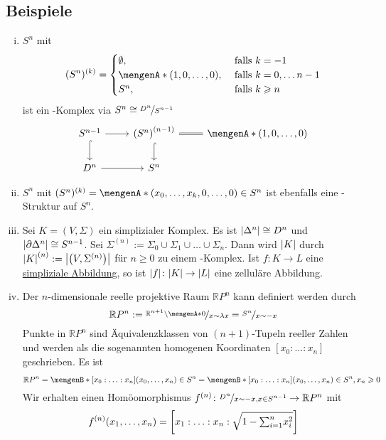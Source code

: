 \subsection[Beispiele für \CW-Komplexe]{Beispiele} %
\label{sub:115}
\begin{enumerate}[(i)]
	\item $S^n$ mit 
	\[
		(S^n)^{(k)} = \begin{cases}
			\emptyset, &\text{ falls }k=-1\\
			\set{(1,0,\ldots ,0)}, &\text{ falls } k=0, \ldots n-1 \\
			S^n , &\text{ falls } k \ge n 
		\end{cases}
	\]
	ist ein \CW-Komplex via $S^n \cong \nicefrac{D^n}{S^{n-1}}$
	\[
		\begin{tikzcd}
			S^{n-1} \rar \dar[hook] & \enbrace*{S^n}^{(n-1)} \rar[equal] \dar[hook] & \set{(1,0,\ldots ,0)}   \\
			D^n \rar & S^n  
		\end{tikzcd}
	\]
	\item $S^n$ mit $(S^n)^{(k)} = \set{(x_0, \ldots ,x_k,0, \ldots ,0) \in S^n} $ ist ebenfalls eine \CW-Struktur auf $S^n$.
	\item Sei $K=(V,\Sigma)$ ein simplizialer Komplex. Es ist $\abs*{\Delta^n} \cong D^n$ und $\abs*{\partial \Delta^n} \cong S^{n-1}$. Sei 
	$\Sigma^{(n)} := \Sigma_0 \cup \Sigma_1 \cup \ldots \cup \Sigma_n$. Dann wird $\abs*{K}$ durch $\abs*{K}^{(n)} := \abs*{\enbrace*{V,\Sigma^{(n)}}}$ für $n \ge 0$ zu 
	einem \CW-Komplex. Ist $f \colon K \to L$ eine \hyperref[sub:25]{simpliziale Abbildung}, so ist $\abs*{f} \colon \abs*{K} \to \abs*{L}$ eine zelluläre Abbildung.
	\item \label{enum:115:4}Der $n$-dimensionale reelle projektive Raum $\mathds{R}P^n$ kann definiert werden durch 
	\[
		\mathds{R}P^n := \nicefrac{\mathds{R}^{n+1} \setminus \set{0}}{x \sim \lambda x} = \nicefrac{S^n}{x \sim -x}
	\]
	Punkte in $\mathds{R}P^n$ sind Äquivalenzklassen von $(n+1)$-Tupeln reeller Zahlen und werden als die sogenannten homogenen Koordinaten $[x_0 : \ldots : x_n]$ 
	geschrieben. Es ist 
	\[
		\mathds{R}P^n = \set[{[x_0 : \ldots : x_n]}]{(x_0, \ldots ,x_n) \in S^n \rule{0cm}{1em}} 
		= \set[{[x_0 : \ldots : x_n]}]{(x_0, \ldots ,x_n) \in S^n, x_n \ge 0 \rule{0cm}{1em}}
	\]
	Wir erhalten einen Homöomorphismus $f^{(n)} \colon \nicefrac{D^n}{x \sim -x, x \in S^{n-1}} \to \mathds{R}P^n$ mit
	\[
		f^{(n)} \enbrace*{x_1, \ldots ,x_n} = \benbrace*{x_1 : \ldots : x_n : \sqrt{1- {\textstyle\sum\nolimits_{i=1}^{n}} x_i^2}} 
\]
\end{enumerate}
